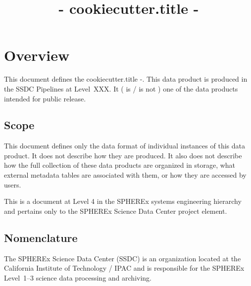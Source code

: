\documentclass[DP]{spherex}
\title{ {{- cookiecutter.title -}} }
\begin{document}
\maketitle

\begin{dochistory}
\end{dochistory}

\section{Overview}


This document defines the {{ cookiecutter.title -}}.
This data product is produced in the SSDC Pipelines at Level~XXX.
It ( is / is not ) one of the data products intended for public release.

\subsection{Scope}


This document defines only the data format of individual instances of this
data product.
It does not describe how they are produced.
It also does not describe how the full collection of these data products are
organized in storage, what external metadata tables are associated with them,
or how they are accessed by users.

This is a document at Level 4 in the SPHEREx systems engineering hierarchy
and pertains only to the SPHEREx Science Data Center project element.

\subsection{Nomenclature}

The SPHEREx Science Data Center (SSDC) is an organization located at
the California Institute of Technology / IPAC and is responsible for the
SPHEREx Level~1--3 science data processing and archiving.

\end{document}
